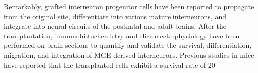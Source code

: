 Remarkably,  grafted interneuron progenitor cells have been reported to propagate from the  original site, differentiate into various mature interneurons, and integrate  into neural circuits of the postnatal and adult brains. After the  transplantation, immunohistochemistry and slice electrophysiology have been  performed on brain sections to quantify and validate the survival,  differentiation, migration, and integration of MGE-derived interneurons.  Previous studies in mice have reported that the transplanted cells exhibit a  survival rate of 20 %




